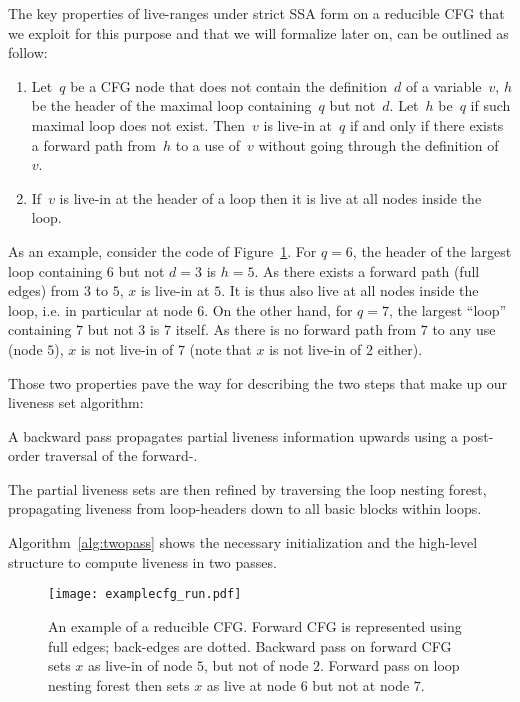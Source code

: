 The key properties of live-ranges under strict SSA form on a reducible CFG that we exploit for this purpose and that we will formalize later on, can be outlined as follow:
\begin{enumerate}
\item
	Let~$q$ be a CFG node that does not contain the definition~$d$ of a variable~$v$, $h$ be the header of the maximal loop containing~$q$ but not~$d$.
	Let~$h$ be~$q$ if such maximal loop does not exist.
	Then~$v$ is live-in at~$q$ if and only if there exists a forward path from~$h$ to a use of~$v$ without going through the definition of~$v$.
\item
	If~$v$ is live-in at the header of a loop then it is live at all nodes inside the loop.
\end{enumerate}

As an example, consider the code of Figure~\ref{fig:examplecfg_run}. For $q=6$, the header of the largest loop containing $6$ but not $d=3$ is $h=5$. As there exists a forward path (full edges) from $3$ to $5$, $x$ is live-in at $5$. It is thus also live at all nodes inside the loop, i.e. in particular at node $6$. On the other hand, for $q=7$, the largest ``loop'' containing $7$ but not $3$ is $7$ itself. As there is no forward path from $7$ to any use (node $5$), $x$ is not live-in of $7$ (note that $x$ is not live-in of $2$ either).

Those two properties pave the way for describing the two steps that make up our liveness set algorithm:
\begin{compactenum}
\item
	A backward pass propagates partial liveness information upwards using a post-order traversal of the forward-\@CFG.
\item
	The partial liveness sets are then refined by traversing the loop nesting forest, propagating liveness from loop-headers down to all basic blocks within loops.
\end{compactenum}
Algorithm~\ref{alg:twopass} shows the necessary initialization and the high-level structure to compute liveness in two passes.

\begin{figure}[t]
   \begin{center}
       \texttt{[image: examplecfg\_run.pdf]}
       \caption{An example of a reducible CFG. Forward CFG is represented using full edges; back-edges are dotted. Backward pass on forward CFG sets $x$ as live-in of node $5$, but not of node $2$. Forward pass on loop nesting forest then sets $x$ as live at node $6$ but not at node $7$. }
       \label{fig:examplecfg_run}
   \end{center}
\end{figure}


